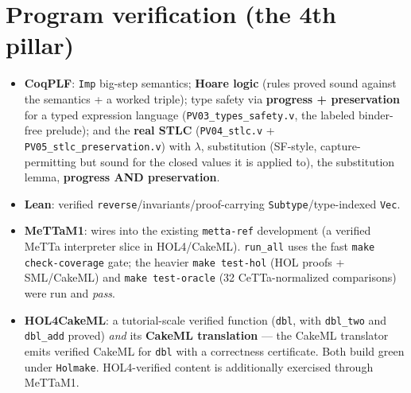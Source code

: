 \documentclass[11pt]{article}
\begin{document}
\section{Program verification (the 4th pillar)}
\begin{itemize}\itemsep1pt
  \item \textbf{CoqPLF}: \texttt{Imp} big-step semantics; \textbf{Hoare logic} (rules proved sound
        against the semantics + a worked triple); type safety via \textbf{progress + preservation}
        for a typed expression language (\texttt{PV03\_types\_safety.v}, the labeled binder-free prelude);
        and the \textbf{real STLC} (\texttt{PV04\_stlc.v} + \texttt{PV05\_stlc\_preservation.v}) with $\lambda$,
        substitution (SF-style, capture-permitting but sound for the closed values it is applied to),
        the substitution lemma, \textbf{progress AND preservation}.
  \item \textbf{Lean}: verified \texttt{reverse}/invariants/proof-carrying \texttt{Subtype}/type-indexed
        \texttt{Vec}.
  \item \textbf{MeTTaM1}: wires into the existing \texttt{metta-ref} development (a verified MeTTa
        interpreter slice in HOL4/CakeML). \texttt{run\_all} uses the fast \texttt{make check-coverage}
        gate; the heavier \texttt{make test-hol} (HOL proofs + SML/CakeML) and \texttt{make test-oracle}
        (32 CeTTa-normalized comparisons) were run and \emph{pass}.
  \item \textbf{HOL4CakeML}: a tutorial-scale verified function (\texttt{dbl}, with \texttt{dbl\_two}
        and \texttt{dbl\_add} proved) \emph{and} its \textbf{CakeML translation} --- the CakeML
        translator emits verified CakeML for \texttt{dbl} with a correctness certificate. Both build
        green under \texttt{Holmake}. HOL4-verified content is additionally exercised through MeTTaM1.
\end{itemize}
\end{document}
